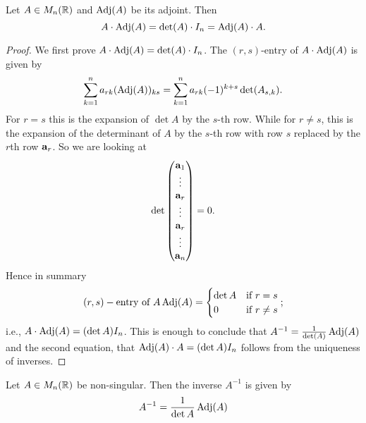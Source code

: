 \documentclass[10pt, a4paper]{article}
\begin{document}
\begin{center}
\end{center}
\hfill

\begin{proposition}
    Let $A \in M_n(\mathbb{R})$ and $\operatorname{Adj}(A)$ be its adjoint.
    Then
    \[
    A \cdot \operatorname{Adj}(A) = \det(A) \cdot I_n = \operatorname{Adj}(A) \cdot A.
    \]
    \begin{proof}
        We first prove $A \cdot \operatorname{Adj}(A) = \det(A) \cdot I_n$.
        The $(r, s)$-entry of $A \cdot \operatorname{Adj}(A)$ is given by
        \[
        \sum_{k = 1}^{n}a_{rk}(\operatorname{Adj}(A))_{ks} = \sum_{k = 1}^{n}a_{rk}(-1) ^ {k + s}\det(A_{s, k}).
        \]
        For $r = s$ this is the expansion of $\det A$ by the $s$-th row.
        While for $r \neq s$,
        this is the expansion of the determinant of $A$ by the $s$-th row with row $s$ replaced by the $r$th row $\mathbf{a}_r$.
        So we are looking at
        \[
        \det\begin{pmatrix}
            \mathbf{a}_1 \\ \vdots \\ \mathbf{a}_r \\ \vdots \\ \mathbf{a}_r \\ \vdots \\ \mathbf{a}_n
        \end{pmatrix} = 0.
        \]
        Hence in summary
        \[
        (r, s)-\text{entry of } A\operatorname{Adj}(A) = \begin{cases}
            \det A &\text{if } r = s \\
            0 &\text{if } r \neq s
        \end{cases};
        \]
        i.e., $A \cdot \operatorname{Adj}(A) = (\det A)I_n$.
        This is enough to conclude that $A ^ {-1} = \frac{1}{\det(A)}\operatorname{Adj}(A)$ and the second equation,
        that $\operatorname{Adj}(A) \cdot A = (\det A)I_n$ follows from the uniqueness of inverses.
    \end{proof}
\end{proposition}

\begin{theorem}\label{pre_linalg_thm_invbyadjmatr}
    Let $A \in M_n(\mathbb{R})$ be non-singular.
    Then the inverse $A ^ {-1}$ is given by
    \[
    A ^ {-1} = \frac{1}{\det A}\operatorname{Adj}(A)
    \]
\end{theorem}
\end{document}

